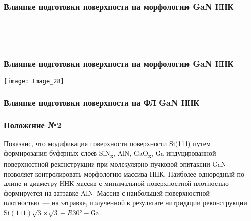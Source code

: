 \begin{frame}
	\frametitle{Влияние подготовки поверхности на морфологию GaN ННК}
	\centering
	\begin{minipage}[t]{0.31\linewidth}
	\end{minipage}
	\\
	\bigskip
	\begin{minipage}[t]{0.31\linewidth}
	\end{minipage}
	\begin{minipage}[t]{0.31\linewidth}
	\end{minipage}
	\begin{minipage}[t]{0.31\linewidth}
	\end{minipage}
	\\
	\bigskip
	\begin{minipage}[t]{0.31\linewidth}
	\end{minipage}
	\begin{minipage}[t]{0.31\linewidth}
	\end{minipage}
	\begin{minipage}[t]{0.31\linewidth}
	\end{minipage}
\end{frame}

\begin{frame}
	\frametitle{Влияние подготовки поверхности на морфологию GaN ННК}
	\centering
	\texttt{[image: Image\_28]}
\end{frame}

\begin{frame}
	\frametitle{Влияние подготовки поверхности на ФЛ GaN ННК}
	\centering
	\begin{minipage}[t]{0.47\linewidth}
	\end{minipage}
	\begin{minipage}[t]{0.47\linewidth}
	\end{minipage}
\end{frame}

\begin{frame}
	\frametitle{Положение №2}
	\large
Показано, что модификация поверхности поверхности Si(111) путем формирования буферных слоёв SiN\textsubscript{x}, AlN, GaO\textsubscript{x}, Ga-индуцированной поверхностной реконструкции при молекулярно-пучковой эпитаксии GaN позволяет контролировать морфологию массива ННК. Наиболее однородный по длине и диаметру ННК массив с минимальной поверхностной плотностью
формируется на затравке AlN. Массив с наибольшей поверхностной плотностью~--- на затравке, полученной в результате нитридации реконструкции
Si\((111)\sqrt{3}\)\(\times\)\(\sqrt{3} - R30\si{\degree} - \text{Ga}\).
\end{frame}

